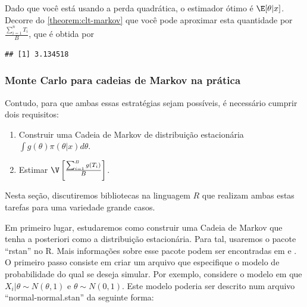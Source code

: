 \begin{example}
\begin{knitrout}
\begin{kframe}
\begin{alltt}
\end{alltt}
\end{kframe}
\end{knitrout}
Dado que você está usando a perda quadrática,
o estimador ótimo é $\E[\theta|x]$.
Decorre do \cref{theorem:clt-markov} que
você pode aproximar esta quantidade por
$\frac{\sum_{i=1}^{n}{T_{i}}}{B}$, que é
obtida por
\begin{knitrout}
\color{fgcolor}\begin{kframe}
\begin{alltt}
\hlstd{(}\hlstd{(}\hlstd{(}\hlopt{^}\hlstd{,}
\end{alltt}
\begin{verbatim}
## [1] 3.134518
\end{verbatim}
\end{kframe}
\end{knitrout}
\end{example}

\subsubsection{Monte Carlo para cadeias de Markov na prática}

Contudo, para que ambas essas estratégias sejam possíveis,
é necessário cumprir dois requisitos:
\begin{enumerate}
 \item Construir uma Cadeia de Markov de distribuição estacionária $\int{g(\theta)\pi(\theta|x)d\theta}$.
 \item Estimar $\V\left[\frac{\sum_{i=1}^{B}{g(T_{i})}}{B}\right]$.
\end{enumerate}
Nesta seção, discutiremos bibliotecas
na linguagem $R$ que realizam ambas estas tarefas
para uma variedade grande casos.

Em primeiro lugar, 
estudaremos como construir uma Cadeia de Markov
que tenha a posteriori como a distribuição estacionária.
Para tal, usaremos o pacote ``rstan'' no R.
Mais informações sobre esse pacote 
podem ser encontradas em \citet{Gelman2014} e \citet{Stan2015}.
O primeiro passo consiste em criar um arquivo
que especifique o modelo de probabilidade do qual se deseja simular.
Por exemplo, considere o modelo em que $X_{i}|\theta \sim N(\theta,1)$
e $\theta \sim N(0,1)$. 
Este modelo poderia ser descrito num arquivo ``normal-normal.stan'' da seguinte forma:

